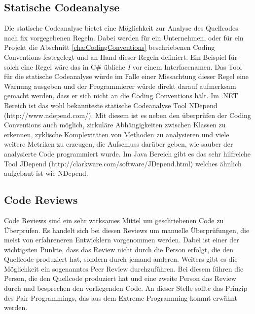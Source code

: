 \subsection{Statische Codeanalyse}
\SuperPar Die statische Codeanalyse bietet eine Möglichkeit zur Analyse des Quellcodes nach fix vorgegebenen Regeln. Dabei werden für ein Unternehmen, oder für ein Projekt die Abschnitt \ref{cha:CodingConventions} beschriebenen Coding Conventions festegelegt und an Hand dieser Regeln definiert. Ein Beispiel für solch eine Regel wäre das in C\# übliche \textit{I} vor einem Interfacenamen. Das Tool für die statische Codeanalyse würde im Falle einer Missachtung dieser Regel eine Warnung ausgeben und der Programmierer würde direkt darauf aufmerksam gemacht werden, dass er sich nicht an die Coding Conventions hält. Im .NET Bereich ist das wohl bekannteste statische Codeanalyse Tool NDepend (http://www.ndepend.com/). Mit diesem ist es neben den überprüfen der Coding Conventions auch möglich, zirkuläre Abhängigkeiten zwischen Klassen zu erkennen, zyklische Komplexitäten von Methoden zu analysieren und viele weitere Metriken zu erzeugen, die Aufschluss darüber geben, wie sauber der analysierte Code programmiert wurde. Im Java Bereich gibt es das sehr hilfreiche Tool JDepend (http://clarkware.com/software/JDepend.html) welches ähnlich aufgebaut ist wie NDepend.

\subsection{Code Reviews}
\SuperPar Code Reviews sind ein sehr wirksames Mittel um geschriebenen Code zu Überprüfen. Es handelt sich bei diesen Reviews um manuelle Überprüfungen, die meist von erfahreneren Entwicklern vorgenommen werden. Dabei ist einer der wichtigsten Punkte, dass das Review nicht durch die Person erfolgt, die den Quellcode produziert hat, sondern durch jemand anderen. Weiters gibt es die Möglichkeit ein sogenanntes Peer Review durchzuführen. Bei diesem führen die Person, die den Quellcode produziert hat und eine zweite Person das Review durch und besprechen den vorliegenden Code. An dieser Stelle sollte das Prinzip des Pair Programmings, das aus dem Extreme Programming kommt erwähnt werden. \cite{BeckExtreme} 
